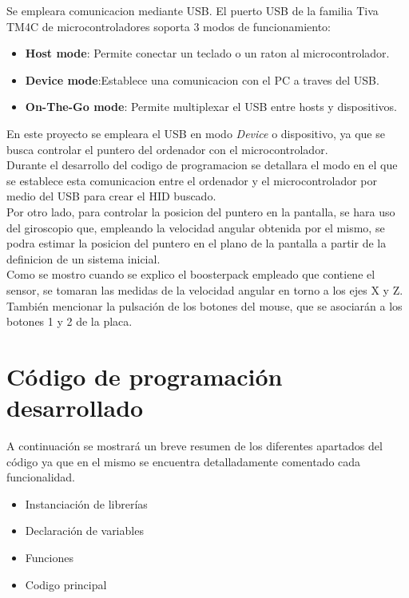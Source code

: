 \documentclass[a4paper,twoside]{article}
\begin{document}
Se empleara comunicacion mediante USB. El puerto USB de la familia Tiva TM4C de microcontroladores soporta 3 modos de funcionamiento:
\begin{itemize}
	\item \textbf{Host mode}: Permite conectar un teclado o un raton al microcontrolador.
	\item \textbf{Device mode}:Establece una comunicacion con el PC a traves del USB.
	\item \textbf{On-The-Go mode}: Permite multiplexar el USB entre hosts y dispositivos.
\end{itemize}
En este proyecto se empleara el USB en modo \textit{Device} o dispositivo, ya que se busca controlar el puntero del ordenador con el microcontrolador.\\
Durante el desarrollo del codigo de programacion se detallara el modo en el que se establece esta comunicacion entre el ordenador y el microcontrolador por medio del USB para crear el HID buscado. \\

Por otro lado, para controlar la posicion del puntero en la pantalla, se hara uso del giroscopio que, empleando la velocidad angular obtenida por el mismo, se podra estimar la posicion del puntero en el plano de la pantalla a partir de la definicion de un sistema inicial. \\
Como se mostro cuando se explico el boosterpack empleado que contiene el sensor, se tomaran las medidas de la velocidad angular en torno a los ejes X y Z. \\
También mencionar la pulsación de los botones del mouse, que se asociarán a los botones 1 y 2 de la placa.
\section{Código de programación desarrollado}
A continuación se mostrará un breve resumen de los diferentes apartados del código ya que en el mismo se encuentra detalladamente comentado cada funcionalidad.
\begin{itemize}
\item Instanciación de librerías
\item Declaración de variables
\item Funciones
\item Codigo principal
\end{itemize}


\newpage
\end{document}
